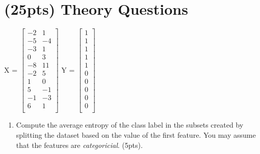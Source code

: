 \documentclass[12pt]{article}
\begin{document}
\maketitle

\section{(25pts) Theory Questions}
\begin{enumerate}


\begin{center}
X = 
$
 \begin{bmatrix}
	-2 & 1\\
	-5 & -4\\	
	-3 & 1\\
	0 & 3\\
	-8 & 11\\
	-2 & 5\\
	1 & 0\\
	5 & -1\\
	-1 & -3\\
	6 & 1\\
	
\end{bmatrix}
$
Y = 
$
 \begin{bmatrix}
	1\\
	1\\
	1\\
	1\\
	1\\
	0\\
	0\\
	0\\
	0\\
	0\\
\end{bmatrix}
$
\end{center}
	\begin{enumerate}
	\item Compute the average entropy of the class label in the subsets created by splitting the dataset based on the value of the first feature.  You may assume that the features are \emph{categoricial}.  (5pts).
	

\end{enumerate}
\end{enumerate}
\end{document}
